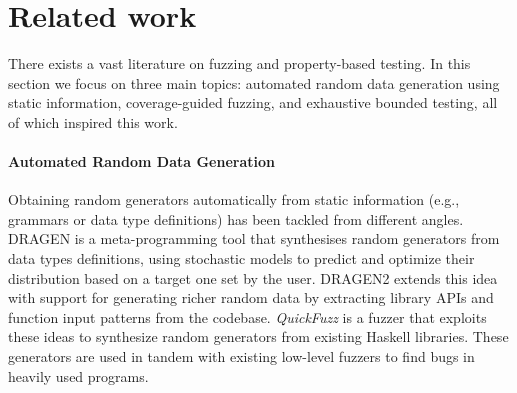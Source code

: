 \documentclass[sigconf, anonymous, review]{acmart}
\begin{document}



\section{Related work}
\label{sec:related}

There exists a vast literature on fuzzing and property-based testing.
%
In this section we focus on three main topics:
%
automated random data generation using static information,
%
coverage-guided fuzzing, and
%
exhaustive bounded testing, all of which inspired this work.


\paragraph{Automated Random Data Generation}

Obtaining random generators automatically from static information (e.g.,
grammars or data type definitions) has been tackled from different angles.
%
DRAGEN \cite{DBLP:conf/haskell/MistaRH18} is a meta-programming tool that
synthesises random generators from data types definitions, using stochastic
models to predict and optimize their distribution based on a target one set by
the user.
%
DRAGEN2 \cite{Mista2019GeneratingRS} extends this idea with support for
generating richer random data by extracting library APIs and function input
patterns from the codebase.
%
%
%
%
\emph{QuickFuzz} \cite{GriecoCB16, grieco2017} is a fuzzer that exploits these
ideas to synthesize random generators from existing Haskell libraries. These
generators are used in tandem with existing low-level fuzzers to find bugs in
heavily used programs.
\end{document}
